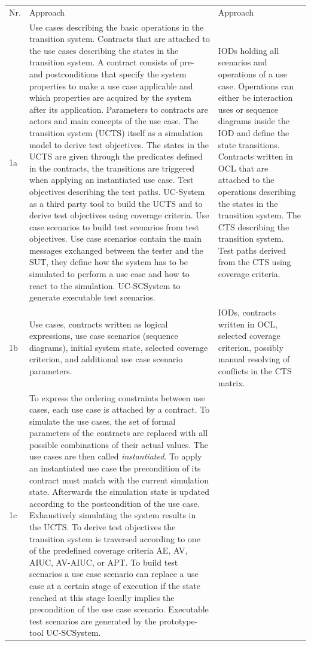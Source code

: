 \begin{longtable}[h]{p{0.5cm}p{}p{}}
	Nr. & Approach \cite{ClementineNebut2006} & Approach \cite{NajlaRaza2007} \\
	1a & 
	Use cases describing the basic operations in the transition system. Contracts that are attached to the use cases describing the states in the transition system. A contract consists of pre- and postconditions that specify the system properties to make a use case applicable and which properties are acquired by the system after its application. Parameters to contracts are actors and main concepts of the use case. The transition system (UCTS) itself as a simulation model to derive test objectives. The states in the UCTS are given through the predicates defined in the contracts, the transitions are triggered when applying an instantiated use case. Test objectives describing the test paths. UC-System as a third party tool to build the UCTS and to derive test objectives using coverage criteria. Use case scenarios to build test scenarios from test objectives. Use case scenarios contain the main messages exchanged between the tester and the SUT, they define how the system has to be simulated to perform a use case and how to react to the simulation. UC-SCSystem to generate executable test scenarios.  & 
	IODs holding all scenarios and operations of a use case. Operations can either be interaction uses or sequence diagrams inside the IOD and define the state transitions. Contracts written in OCL that are attached to the operations describing the states in the transition system. The CTS describing the transition system. Test paths derived from the CTS using coverage criteria.  \\
	1b & 
	Use cases, contracts written as logical expressions, use case scenarios (sequence diagrams), initial system state, selected coverage criterion, and additional use case scenario parameters. & 
	IODs, contracts written in OCL, selected coverage criterion, possibly manual resolving of conflicts in the CTS matrix. \\
	1c &
	To express the ordering constraints between use cases, each use case is attached by a contract. To simulate the use cases, the set of formal parameters of the contracts are replaced with all possible combinations of their actual values. The use cases are then called \textit{instantiated}. To apply an instantiated use case the precondition of its contract must match with the current simulation state. Afterwards the simulation state is updated according to the postcondition of the use case. Exhaustively simulating the system results in the UCTS. To derive test objectives the transition system is traversed according to one of the predefined coverage criteria AE, AV, AIUC, AV-AIUC, or APT. To build test scenarios a use case scenario can replace a use case at a certain stage of execution if the state reached at this stage locally implies the precondition of the use case scenario. Executable test scenarios are generated by the prototype-tool UC-SCSystem. &

\end{longtable}
